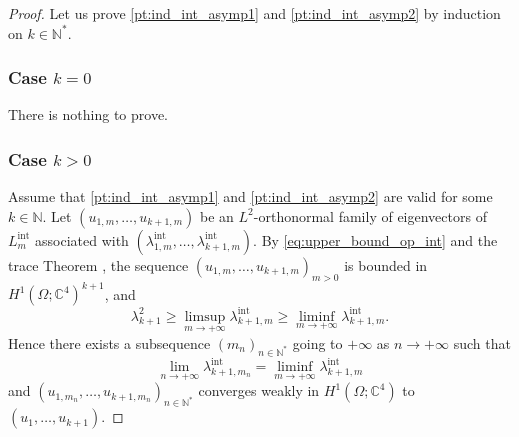 \documentclass[JEP,XML,SOM,Unicode]{cedram}
\newcommand{\intt}{\mathrm{int}}
\theoremstyle{plain}
\theoremstyle{definition}
\newcommand{\CC}{\mathbb{C}}
\newcommand{\NN}{\mathbb{N}}
\begin{document}
\begin{proof}
Let us prove \eqref{pt:ind_int_asymp1} and \eqref{pt:ind_int_asymp2} by induction on $k\in \NN^*$.
\subsubsection*{Case $k\!=\!0$} There is nothing to prove.

\subsubsection*{Case $k\!>\!0$} Assume that \eqref{pt:ind_int_asymp1} and \eqref{pt:ind_int_asymp2} are valid for some $k\!\in\!\NN$. Let $(u_{1,m}, \dots, u_{k+1,m})$ be an $L^2$-orthonormal family of eigenvectors of $L_{m}^\intt$ associated with\hspace{-1.2pt} $(\lambda_{1,m}^\intt,\dots, \lambda_{k+1,m}^\intt)$. By \eqref{eq:upper_bound_op_int} and the trace Theorem \cite[\S 5.5]{evans1998partial}, the sequence $(u_{1,m}, \dots, u_{k+1,m})_{m>0}$ is bounded in $H^1(\Omega; \CC^4)^{k+1}$, and
\begin{equation}\label{eq:ineq_asymp_eigen_int}
\lambda^2_{k+1}\geq \limsup_{m\to+\infty}\lambda_{k+1,m}^\intt\geq \liminf_{m\to+\infty}\lambda_{k+1,m}^\intt.
\end{equation}
Hence there exists a subsequence $(m_n)_{n\in \NN^*}$ going to $+\infty$ as $n\to+\infty$ such that
\[
\lim_{n\to+\infty}\lambda_{k+1,m_n}^\intt = \liminf_{m\to+\infty}\lambda_{k+1,m}^\intt
\]
and $(u_{1,m_n}, \dots, u_{k+1,m_n})_{n\in \NN^*}$ converges weakly in $H^1(\Omega;\CC^4)$ to $(u_1,\dots, u_{k+1})$.


\end{proof}
\end{document}
